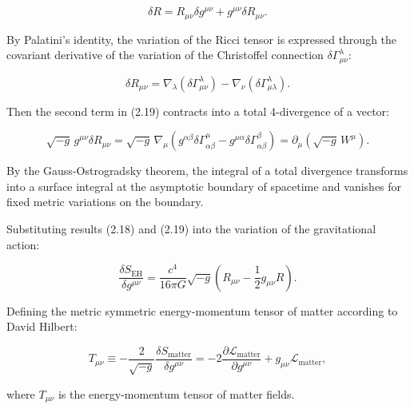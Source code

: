 \begin{equation}\label{eq:2.19}\tag{2.19}
\delta R = R_{\mu\nu} \delta g^{\mu\nu} + g^{\mu\nu} \delta R_{\mu\nu}.
\end{equation}

By Palatini's identity, the variation of the Ricci tensor is expressed through the covariant derivative of the variation of the Christoffel connection $\delta\Gamma^\lambda_{\mu\nu}$:

\begin{equation}\label{eq:2.20}\tag{2.20}
\delta R_{\mu\nu} = \nabla_\lambda (\delta\Gamma^\lambda_{\mu\nu}) - \nabla_\nu (\delta\Gamma^\lambda_{\mu\lambda}).
\end{equation}

Then the second term in (2.19) contracts into a total 4-divergence of a vector:

\begin{equation}\label{eq:2.21}\tag{2.21}
\sqrt{-g} \, g^{\mu\nu} \delta R_{\mu\nu} = \sqrt{-g} \, \nabla_\mu \left( g^{\alpha\beta} \delta\Gamma^\mu_{\alpha\beta} - g^{\mu\alpha} \delta\Gamma^\beta_{\alpha\beta} \right) = \partial_\mu \left( \sqrt{-g} \, W^\mu \right).
\end{equation}

By the Gauss-Ostrogradsky theorem, the integral of a total divergence transforms into a surface integral at the asymptotic boundary of spacetime and vanishes for fixed metric variations on the boundary.

Substituting results (2.18) and (2.19) into the variation of the gravitational action:

\begin{equation}\label{eq:2.22}\tag{2.22}
\frac{\delta S_{\text{EH}}}{\delta g^{\mu\nu}} = \frac{c^4}{16\pi G} \sqrt{-g} \left( R_{\mu\nu} - \frac{1}{2} g_{\mu\nu} R \right).
\end{equation}

Defining the metric symmetric energy-momentum tensor of matter according to David Hilbert:

\begin{equation}\label{eq:2.23}\tag{2.23}
T_{\mu\nu} \equiv -\frac{2}{\sqrt{-g}} \frac{\delta S_{\text{matter}}}{\delta g^{\mu\nu}} = -2 \frac{\partial \mathcal{L}_{\text{matter}}}{\partial g^{\mu\nu}} + g_{\mu\nu} \mathcal{L}_{\text{matter}},
\end{equation}

where $T_{\mu\nu}$ is the energy-momentum tensor of matter fields.

